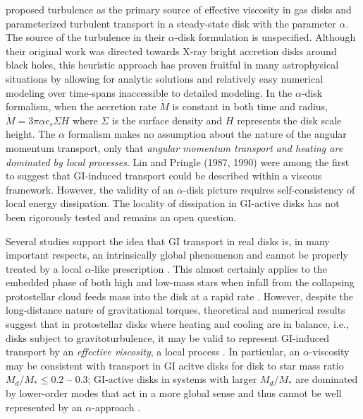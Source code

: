 \documentclass[manuscript]{aastex} %
\begin{document}
\citet{shakura1973} proposed turbulence as the primary source of effective viscosity in gas disks
and parameterized turbulent transport in a steady-state disk with the  parameter $\alpha$.  The source of the 
turbulence in their $\alpha$-disk formulation is unspecified. Although their original work was directed towards X-ray bright
accretion disks around black holes, this heuristic approach has proven fruitful in many astrophysical situations by allowing for analytic solutions and relatively easy numerical modeling over time-spans inaccessible to detailed modeling. In the 
$\alpha$-disk formalism, when the accretion rate $\dot{M}$ is constant in both time and radius, $\dot{M} = 3\pi\alpha c_s \Sigma H$ where $\Sigma$ is the surface density and $H$ represents
the disk scale height. The $\alpha$ formalism makes no assumption about the nature of the angular momentum transport, only that {\it angular momentum transport
and heating are dominated by local processes}. Lin and Pringle (1987, 1990) were among the first to suggest
that GI-induced transport could be described within a viscous
framework.  However, the  validity of an $\alpha$-disk picture requires self-consistency of local energy dissipation. 
The locality of dissipation in GI-active disks has not been rigorously tested and remains an open question. 

Several studies support the idea that GI transport in real disks is, in many important respects, an intrinsically global phenomenon and cannot be properly treated by a local $\alpha$-like prescription \citep{laughlin1996, balbus1999, lodato2005, mejia2005, boley2006, cai2008}.  This almost certainly applies to the embedded phase of both high and low-mass stars when infall from the collapsing protostellar cloud feeds mass into the disk at a rapid
rate \citep[e.g.]{yorke1993, laughlin1994, yorke1999,vorobyov2005,vorobyov2006}.  
However, despite the long-distance nature of gravitational torques, theoretical and numerical results suggest that in protostellar disks where heating and cooling are in balance, i.e., disks subject to gravitoturbulence,
 it may be valid to represent GI-induced transport by an {\it effective viscosity}, a local process \citep{gammie2001, lodato2004, rice2005, cossins2009, vorobyov2010}.  In particular, 
an $\alpha$-viscosity may be consistent
with transport in GI acitve disks for disk to star mass ratio $M_d/M_* \le 0.2$ -- 0.3; GI-active disks
in systems with larger $M_d/M_*$ are dominated by lower-order modes that act in a more global sense and thus cannot be well represented by an $\alpha$-approach
\citep{lodato2004, cossins2009, vorobyov2010}.
\end{document}

